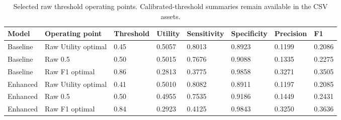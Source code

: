 \begin{table}[!t]
\centering
\caption{Selected raw threshold operating points. Calibrated-threshold summaries remain available in the CSV assets.}
\label{tab:phase8_thresholds}
\scriptsize
\renewcommand{\arraystretch}{1.12}
\begin{tabular*}{\textwidth}{@{\extracolsep{\fill}}llllllll}
\toprule
\textbf{Model} & \textbf{Operating point} & \textbf{Threshold} & \textbf{Utility} & \textbf{Sensitivity} & \textbf{Specificity} & \textbf{Precision} & \textbf{F1} \\
\midrule
Baseline & Raw Utility optimal & 0.45 & 0.5057 & 0.8013 & 0.8923 & 0.1199 & 0.2086 \\
Baseline & Raw 0.5 & 0.50 & 0.5015 & 0.7676 & 0.9088 & 0.1335 & 0.2275 \\
Baseline & Raw F1 optimal & 0.86 & 0.2813 & 0.3775 & 0.9858 & 0.3271 & 0.3505 \\
Enhanced & Raw Utility optimal & 0.41 & 0.5010 & 0.8082 & 0.8911 & 0.1197 & 0.2085 \\
Enhanced & Raw 0.5 & 0.50 & 0.4955 & 0.7535 & 0.9186 & 0.1449 & 0.2431 \\
Enhanced & Raw F1 optimal & 0.84 & 0.2923 & 0.4125 & 0.9843 & 0.3250 & 0.3636 \\
\bottomrule
\end{tabular*}
\end{table}
